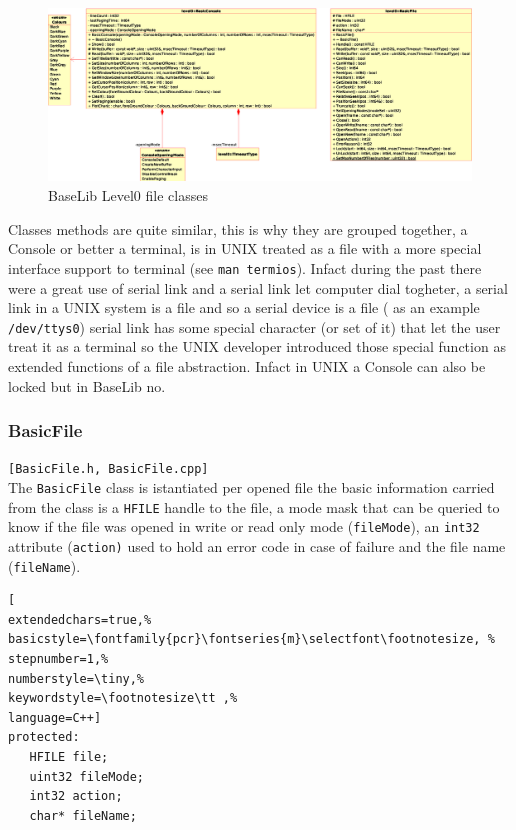 \begin{figure}[h!]
 \begin{center}
  \includegraphics[width=\textwidth]{level0/level0-file.eps}
  \caption{BaseLib Level0 file classes}
  \label{f:level0:file}
 \end{center}
\end{figure}

Classes methods are quite similar, this is why they are grouped together, a Console or better a terminal, is in UNIX treated as a file with a more special interface support to terminal (see \texttt{man termios}). Infact during the past there were a great use of serial link and a serial link let computer dial togheter, a serial link in a UNIX system is a file and so a serial device is a file ( as an example \texttt{/dev/ttys0}) serial link has some special character (or set of it) that let the user treat it as a terminal so the UNIX developer introduced those special function as extended functions of a file abstraction. Infact in UNIX a Console can also be locked but in BaseLib no.



\subsubsection{BasicFile}
\texttt{[BasicFile.h, BasicFile.cpp]}\\
The \texttt{BasicFile} class is istantiated per opened file the basic information carried from the class is a \texttt{HFILE} handle to the file, a mode mask that can be queried to know if the file was opened in write or read only mode (\texttt{fileMode}), an \texttt{int32} attribute (\texttt{action)} used to hold an error code in case of failure and the file name (\texttt{fileName}).

\begin{lstlisting}[
extendedchars=true,%
basicstyle=\fontfamily{pcr}\fontseries{m}\selectfont\footnotesize, %
stepnumber=1,%
numberstyle=\tiny,%
keywordstyle=\footnotesize\tt ,%
language=C++]
protected:
   HFILE file;
   uint32 fileMode;
   int32 action;
   char* fileName;
\end{lstlisting}

